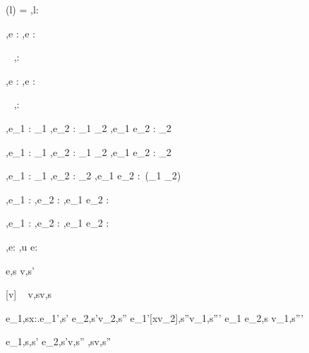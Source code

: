   {\Sigma(l) = \tau}
  {\Gamma,\Sigma\infers l:\Reference \tau}


  {\Gamma,\Sigma \infers e : \tau}
  {\Gamma,\Sigma \infers \Edit e : \Task \tau}

  {\ }
  {\Gamma,\Sigma \infers \Enter \tau : \Task \tau}

  {\Gamma,\Sigma \infers e : \Reference \tau}
  {\Gamma,\Sigma \infers \Update e : \Task \tau}


  {\ }
  {\Gamma,\Sigma \infers \Fail : \Task \tau}


  {
    {\Gamma,\Sigma \infers e_1 : \Task \tau_1}
    {\Gamma,\Sigma \infers e_2 : \tau_1 \to \Task \tau_2}}
  {\Gamma,\Sigma \infers e_1 \Then e_2 : \Task \tau_2}


  {
    {\Gamma,\Sigma \infers e_1 : \Task \tau_1}
    {\Gamma,\Sigma \infers e_2 : \tau_1 \to \Task \tau_2}}
  {\Gamma,\Sigma \infers e_1 \Next e_2 : \Task \tau_2}


  {\Gamma,\Sigma \infers e_1 : \Task \tau_1  \Quad
   \Gamma,\Sigma \infers e_2 : \Task \tau_2}
  {\Gamma,\Sigma \infers e_1 \And e_2 : \Task\,(\tau_1 \times \tau_2)}


  {
    {\Gamma,\Sigma \infers e_1 : \Task \tau}
    {\Gamma,\Sigma \infers e_2 : \Task \tau}}
  {\Gamma,\Sigma \infers e_1 \Or e_2 : \Task \tau}


  {
    {\Gamma,\Sigma \infers e_1 : \Task \tau}
    {\Gamma,\Sigma \infers e_2 : \Task \tau}}
  {\Gamma,\Sigma \infers e_1 \Xor e_2 : \Task \tau}


  {\Gamma,\Sigma\infers e:\Task\tau}
  {\Gamma,\Sigma\infers u \At e:\Task\tau}





  {e,s \evaluate v,s'}


[v\in{}]
  {\ }
  {v,s\evaluate v,s}

  {
    {e_1,s\evaluate \lambda x:\tau.e_1',s' \Quad
     e_2,s'\evaluate v_2,s''}
    {e_1'[x\mapsto v_2],s''\evaluate v_1,s'''}}
  {e_1 e_2,s \evaluate v_1,s'''}


    {e_1,s\evaluate \True,s' \Quad
     e_2,s'\evaluate v,s''}
    {,s\evaluate v,s''}

